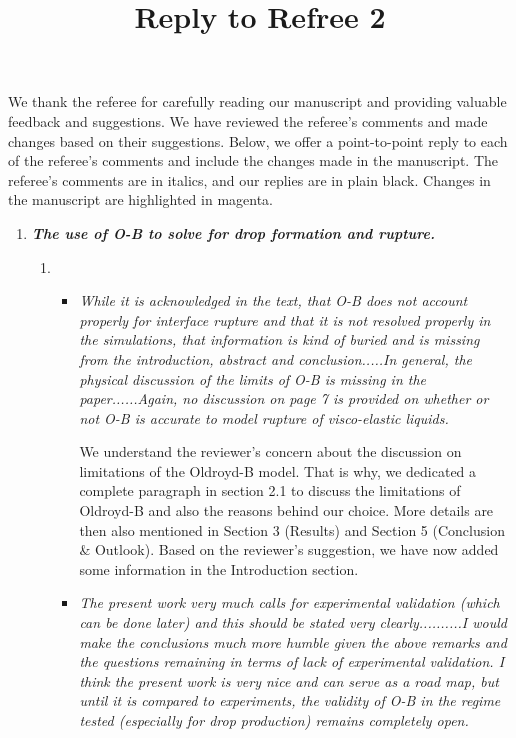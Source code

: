 \documentclass[]{article}
\title{\textbf{Reply to Refree 2}}
\date{\vspace{-5ex}}
\newcommand{\vsy}[1]{\todo[color=orange, bordercolor=none, textcolor=white]{Vatsal}\textcolor{orange}{#1}}
\begin{document}
\maketitle %

We thank the referee for carefully reading our manuscript and providing valuable feedback and suggestions. We have reviewed the referee’s comments and made changes based on their suggestions. Below, we offer a point-to-point reply to each of the referee’s comments and include the changes made in the manuscript. The referee’s comments are in italics, and our replies are in plain black. Changes in the manuscript are highlighted in magenta.

\begin{enumerate}
    \item \textbf{\textit{The use of O-B to solve for drop formation and rupture.}}
 \begin{enumerate}
    \item
     \begin{itemize}
        \item  \textit{While it is acknowledged in the text, that O-B does not account properly for interface rupture and that it is not resolved properly in the simulations, that information is kind of buried and is missing from the introduction, abstract and conclusion.....In general, the physical discussion of the limits of O-B is missing in the paper......Again, no discussion on page 7 is provided on whether or not O-B is accurate to model rupture of visco-elastic liquids.}

        We understand the reviewer's concern about the discussion on limitations of the Oldroyd-B model.
        That is why, we dedicated a complete paragraph in section 2.1 to discuss the limitations of Oldroyd-B and also the reasons behind our choice. More details are then also mentioned in Section 3 (Results) and Section 5 (Conclusion \& Outlook). Based on the reviewer's suggestion, we have now added some information in the Introduction section.


        \item \textit{The present work very much calls for experimental validation (which can be done later) and this should be stated very clearly..........I would make the conclusions much more humble given the above remarks and the questions remaining in terms of lack of experimental validation. I think the present work is very nice and can serve as a road map, but until it is compared to experiments, the validity of O-B in the regime tested (especially for drop production) remains completely open. }


\end{itemize}
\end{enumerate}
\end{enumerate}
\end{document}

